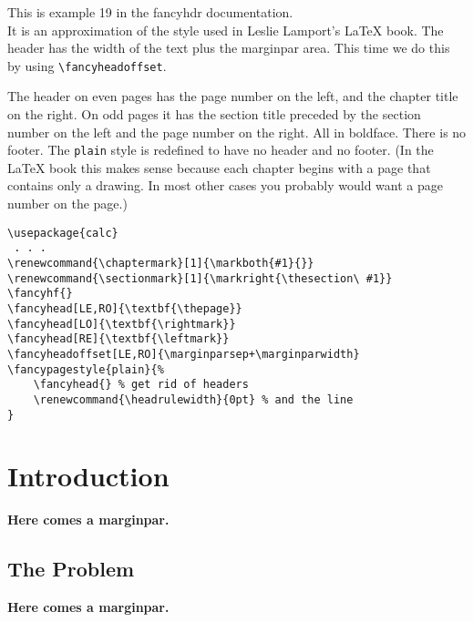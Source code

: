 \documentclass[openany]{book}
\renewcommand{\chaptermark}[1]{\markboth{#1}{}}
\renewcommand{\sectionmark}[1]{\markright{\thesection\ #1}}
\renewcommand{\headrulewidth}{0pt} %
\begin{document}
\tableofcontents

\bigskip

\begin{boxedminipage}{\textwidth}
This is example 19 in the fancyhdr documentation.\\
It is an approximation of the style used in Leslie Lamport's \LaTeX{} book.
The header has the width of the text plus the marginpar area. This time we do this by using \verb|\fancyheadoffset|.

The header on even pages has the page number on the left, and the chapter title on the right. On odd pages it has the section title preceded by the section number on the left and the page number on the right. All in boldface.
There is no footer. The \texttt{plain} style is redefined to have no header and no footer. (In the \LaTeX{} book this makes sense because each chapter begins with a page that contains only a drawing. In most other cases you probably would want a page number on the page.)
\begin{verbatim}
\usepackage{calc}
 . . .
\renewcommand{\chaptermark}[1]{\markboth{#1}{}}
\renewcommand{\sectionmark}[1]{\markright{\thesection\ #1}}
\fancyhf{}
\fancyhead[LE,RO]{\textbf{\thepage}}
\fancyhead[LO]{\textbf{\rightmark}}
\fancyhead[RE]{\textbf{\leftmark}}
\fancyheadoffset[LE,RO]{\marginparsep+\marginparwidth}
\fancypagestyle{plain}{%
    \fancyhead{} % get rid of headers
    \renewcommand{\headrulewidth}{0pt} % and the line
}
\end{verbatim}
\end{boxedminipage}

\chapter{Introduction}

\textbf{Here comes a marginpar.}

\lipsum

\section{The Problem}
\label{sec:problem}

\textbf{Here comes a marginpar.}
\end{document}
